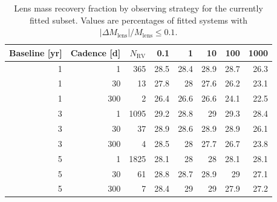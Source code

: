 \begin{table}
\centering
\small
\caption{Lens mass recovery fraction by observing strategy for the currently fitted subset. Values are percentages of fitted systems with $|\Delta M_\mathrm{lens}|/M_\mathrm{lens} \leq 0.1$.}
\label{tab:mass-recovery-by-strategy}
\begin{tabular}{rrrrrrrr}
\hline
Baseline [yr] & Cadence [d] & $N_\mathrm{RV}$ & 0.1 & 1 & 10 & 100 & 1000 \\
\hline
1 & 1 & 365 & 28.5 & 28.4 & 28.9 & 28.7 & 26.3 \\
1 & 30 & 13 & 27.8 & 28 & 27.6 & 26.2 & 23.1 \\
1 & 300 & 2 & 26.4 & 26.6 & 26.6 & 24.1 & 22.5 \\
3 & 1 & 1095 & 29.2 & 28.8 & 29 & 29.3 & 28.4 \\
3 & 30 & 37 & 28.9 & 28.6 & 28.9 & 28.9 & 26.1 \\
3 & 300 & 4 & 28.5 & 28 & 27.7 & 26.7 & 23.8 \\
5 & 1 & 1825 & 28.1 & 28 & 28 & 28.1 & 28.1 \\
5 & 30 & 61 & 28.8 & 28.7 & 28.9 & 29 & 27.1 \\
5 & 300 & 7 & 28.4 & 29 & 29 & 27.9 & 27.2 \\
\hline
\end{tabular}
\end{table}
